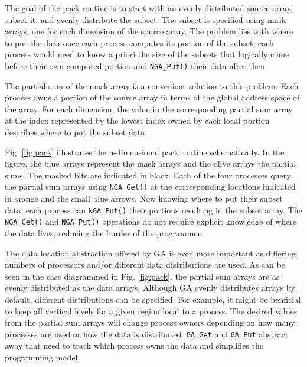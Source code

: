 The goal of the pack routine is to start with an evenly distributed source
array, subset it, and evenly distribute the subset.  The subset is specified
using mask arrays, one for each dimension of the source array.  The problem
lies with where to put the data once each process computes its portion of the
subset; each process would need to know a priori the size of the subsets that
logically come before their own computed portion and \verb=NGA_Put()= their
data after then.

The partial sum of the mask array is a convenient solution to this problem.
Each process owns a portion of the source array in terms of the global address
space of the array.  For each dimension, the value in the corresponding
partial sum array at the index represented by the lowest index owned by each
local portion describes where to put the subset data.

Fig. \ref{fig:pack} illustrates the n-dimensional pack routine schematically.
In the figure, the blue arrays represent the mask arrays and the olive arrays
the partial sums.  The masked bits are indicated in black.  Each of the four
processes query the partial sum arrays using \verb=NGA_Get()= at the
corresponding locations indicated in orange and the small blue arrows.  Now
knowing where to put their subset data, each process can \verb=NGA_Put()=
their portions resulting in the subset array.  The \verb=NGA_Get()= and
\verb=NGA_Put()= operations do not require explicit knowledge of where the
data lives, reducing the burder of the programmer.

The data location abstraction offered by GA is even more important as
differing numbers of processors and/or different data distributions are used.
As can be seen in the case diagrammed in Fig. \ref{fig:pack}, the partial sum
arrays are as evenly distributed as the data arrays.  Although GA evenly
distributes arrays by default, different distributions can be specified.  For
example, it might be benficial to keep all vertical levels for a given region
local to a process.  The desired values from the partial sum arrays will
change process owners depending on how many processes are used or how the data
is distributed.  \verb+GA_Get+ and \verb+GA_Put+ abstract away that need to
track which process owns the data and simplifies the programming model.
